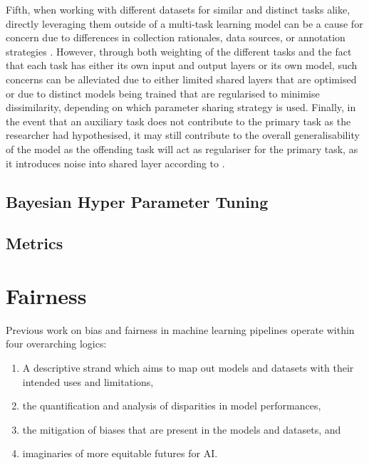 Fifth, when working with different datasets for similar and distinct tasks alike, directly leveraging them outside of a multi-task learning model can be a cause for concern due to differences in collection rationales, data sources, or annotation strategies \cite{Waseem:2018}. However, through both weighting of the different tasks and the fact that each task has either its own input and output layers or its own model, such concerns can be alleviated due to either limited shared layers that are optimised or due to distinct models being trained that are regularised to minimise dissimilarity, depending on which parameter sharing strategy is used.
Finally, in the event that an auxiliary task does not contribute to the primary task as the researcher had hypothesised, it may still contribute to the overall generalisability of the model as the offending task will act as regulariser for the primary task, as it introduces noise into shared layer according to \cite{CITE: Cite paper that argues the regularising effect of aux tasks}.

%
%
\subsection{Bayesian Hyper Parameter Tuning}\label{sub:bho}

\subsection{Metrics}


\section{Fairness}\label{sec:fairlitt}

Previous work on bias and fairness in machine learning pipelines operate within four overarching logics:

\begin{enumerate}
  \item{A descriptive strand which aims to map out models and datasets with their intended uses and limitations, }
  \item{the quantification and analysis of disparities in model performances,}
  \item{the mitigation of biases that are present in the models and datasets, and}
  \item{imaginaries of more equitable futures for AI.}
\end{enumerate}

